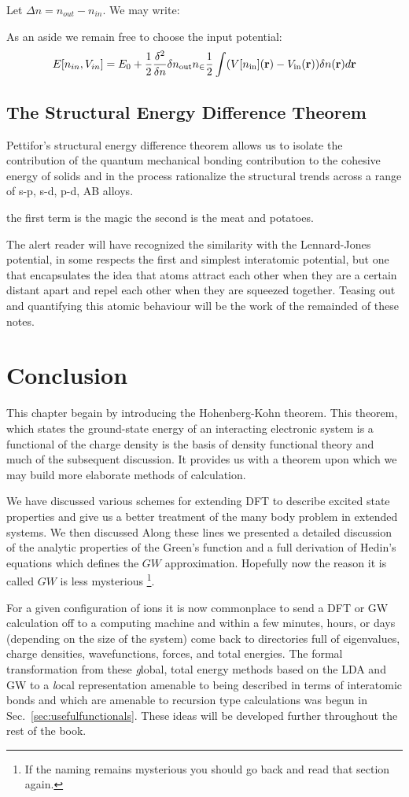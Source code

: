 Let $\Delta n = n_{out}-n_{in}$. We may write:

As an aside we remain free to choose the input potential:
%
\begin{equation}
E[n_{in},V_{in}] = E_{0} + \frac{1}{2} \frac{\delta^{2}}{\delta n}\delta n_{\rm out} n_{\in} 
\frac{1}{2}\int (V[n_{\rm in}]({\bf r}) - V_{\rm in}({\bf r}))\delta n({\bf r}) d{\bf r} 
\end{equation}
%

\subsection{The Structural Energy Difference Theorem}
Pettifor's structural energy difference theorem\cite{pettifor86} 
allows us to isolate the contribution of the quantum mechanical bonding contribution
to the cohesive energy of solids and in the process rationalize
the structural trends across a range of s-p, s-d, p-d, AB alloys.

the first term is the magic the second is the meat and potatoes.

The alert reader will have recognized the similarity with the Lennard-Jones
potential, in some respects the first and simplest interatomic potential, 
but one that encapsulates the idea that atoms attract each other
when they are a certain distant apart and repel each 
other when they are squeezed together. Teasing out and quantifying this
atomic behaviour will be the work of the remainded of these notes. 

\section{Conclusion}
\noindent
This chapter begain by introducing the Hohenberg-Kohn theorem. This theorem,
which states the ground-state energy of an interacting electronic system 
is a functional of the charge density is the basis of density functional theory
and much of the subsequent discussion. It provides us with a theorem upon which we may
build more elaborate methods of calculation.

We have discussed various schemes for extending DFT
to describe excited state properties and give us a better treatment of
the many body problem in extended systems. We then discussed 
Along these lines we presented a detailed discussion
of the analytic properties of the Green's function and a full derivation of Hedin's
equations which defines the $GW$ approximation. Hopefully now the reason it is called
$GW$ is less mysterious \footnote{If the naming remains mysterious you 
should go back and read that section again.}.

For a given configuration of ions it is now commonplace to send a 
DFT or GW calculation off to a computing machine and within a few minutes, hours, or 
days (depending on the size of the system) come back to directories 
full of eigenvalues, charge densities, wavefunctions, forces, and total energies.
The formal transformation from these {\emph global}, total energy methods 
based on the LDA and GW to a {\emph local representation} amenable 
to being described in terms of interatomic bonds and which are 
amenable to recursion type calculations 
was begun in Sec.~\ref{sec:usefulfunctionals}. 
These ideas will be developed further throughout the rest of the book.
